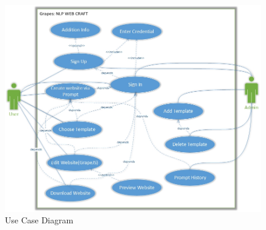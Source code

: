 \documentclass[12pt]{report}
\begin{document}
\begin{figure}[ht]
    \centering
    \includegraphics[width=1\textwidth]{Media/uc.jpg} %
    \caption{Use Case Diagram}
    \label{fig:drawing1}
\end{figure}
\newpage
\end{document}
